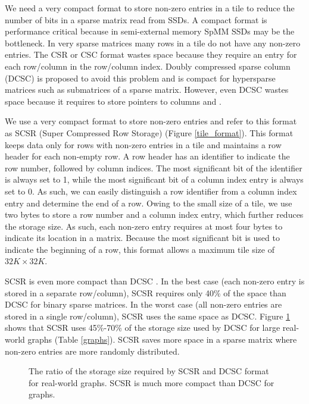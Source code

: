 We need a very compact format to store non-zero entries in a tile to reduce
the number of bits in a sparse matrix read from SSDs. A compact format is
performance critical because in semi-external memory SpMM SSDs
may be the bottleneck. In very sparse matrices many rows in a tile
do not have any non-zero entries. The CSR or CSC format wastes space because
they require an entry for each row/column in the row/column index. Doubly
compressed sparse column (DCSC) \cite{Buluc08} is proposed to avoid this problem
and is compact for hypersparse matrices such as submatrices of
a sparse matrix. However, even DCSC wastes space because it requires to store
pointers to columns and .

We use a very compact format to store non-zero entries and refer to this
format as SCSR (Super Compressed Row Storage) (Figure \ref{tile_format}).
This format keeps data only for rows with non-zero entries in a tile and
maintains a row header for each non-empty row. A row header has an identifier
to indicate the row number, followed by column indices. 
The most significant bit of the identifier is always set to 1, while the most
significant bit of a column index entry is always set to 0. As such, we can easily
distinguish a row identifier from a column index entry and determine the end
of a row. Owing to the small size of a tile, we use two bytes to store a row
number and a column index entry, which further reduces the storage size. As such,
each non-zero entry requires at most four bytes to indicate its location in
a matrix. Because the most significant bit is used to indicate the beginning
of a row, this format allows a maximum tile size of $32K \times 32K$.

SCSR is
even more compact than DCSC \cite{Buluc08}. In the best case (each non-zero
entry is stored in a separate row/column), SCSR requires only 40\% of the space
than DCSC for binary sparse matrices. In the worst case (all non-zero entries
are stored in a single row/column), SCSR uses the same space as DCSC. Figure
\ref{fig:storage} shows that SCSR uses 45\%-70\% of the storage size used by
DCSC for large real-world graphs (Table \ref{graphs}). SCSR saves more space
in a sparse matrix where non-zero entries are more randomly distributed.

\begin{figure}
	\begin{center}
		\footnotesize
		
		\caption{The ratio of the storage size required by SCSR and DCSC
			\cite{Buluc08} format for real-world graphs. SCSR is much more
		compact than DCSC for graphs.}
		\label{fig:storage}
	\end{center}
\end{figure}

